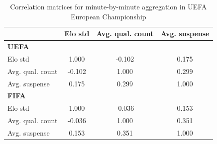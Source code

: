 \begin{table}[H]
\centering
\small
\caption{Correlation matrices for minute-by-minute aggregation in UEFA European Championship}
\label{tab:corr_eu_mbm}
\begin{tabular}{lccc}
\toprule
 & Elo std & Avg. qual. count & Avg. suspense \\
\midrule
\multicolumn{4}{l}{\textbf{UEFA}} \\
Elo std             & 1.000 & -0.102 & 0.175 \\
Avg. qual. count    & -0.102 & 1.000 & 0.299 \\
Avg. suspense       & 0.175 & 0.299 & 1.000 \\
\midrule
\multicolumn{4}{l}{\textbf{FIFA}} \\
Elo std             & 1.000 & -0.036 & 0.153 \\
Avg. qual. count    & -0.036 & 1.000 & 0.351 \\
Avg. suspense       & 0.153 & 0.351 & 1.000 \\
\bottomrule
\end{tabular}
\end{table}
